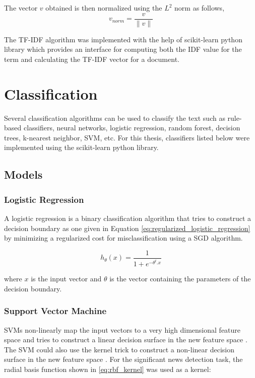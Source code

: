 The vector $v$ obtained is then normalized using the $L^2$ norm as follows,
\begin{equation}
    v_{norm} = \frac{v}{\lVert v \rVert}
\end{equation}

The TF-IDF algorithm was implemented with the help of scikit-learn \cite{scikit-learn} python library which provides an interface for computing both the IDF value for the term and calculating the TF-IDF vector for a document.

\section{Classification}\label{classification}
Several classification algorithms can be used to classify the text such as rule-based classifiers, neural networks, logistic regression, random forest, decision trees, k-nearest neighbor, SVM\cite{cortes1995support}, etc. 
For this thesis, classifiers listed below were implemented using the scikit-learn python library.

\subsection{Models}
\subsubsection{Logistic Regression}
A logistic regression is a binary classification algorithm that tries to construct a decision boundary as one given in Equation \eqref{eq:regularized_logistic_regression} by minimizing a regularized cost for misclassification using a SGD algorithm.

\begin{equation}
    \label{eq:regularized_logistic_regression}
    h_{\theta}(x) = \frac{1}{1 + {e}^{-{\theta}^{t}. x}}
\end{equation}

\noindent
where $x$ is the input vector and $\theta$ is the vector containing the parameters of the decision boundary. 

\subsubsection{Support Vector Machine}
SVMs non-linearly map the input vectors to a very high dimensional feature space and tries to construct a linear decision surface in the new feature space \cite{cortes1995support}. The SVM could also use the kernel trick to construct a non-linear decision surface in the new feature space \cite{cortes1995support}. For the significant news detection task, the radial basis function shown in \eqref{eq:rbf_kernel} was used as a kernel:

